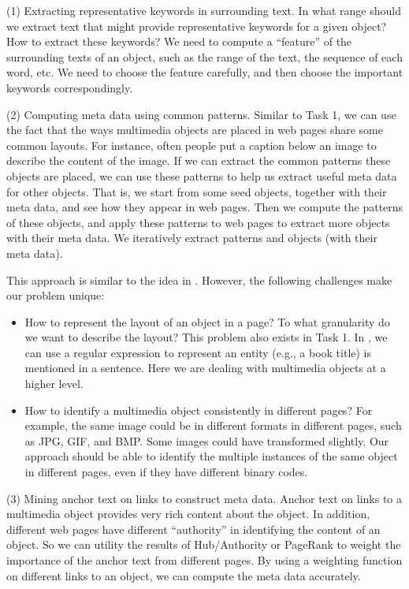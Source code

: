(1) Extracting representative keywords in surrounding text.  In what range
    should we extract text that might provide representative keywords for
    a given object?  How to extract these keywords?  We need to compute a
    ``feature'' of the surrounding texts of an object, such as the range
    of the text, the sequence of each word, etc.  We need to choose the
    feature carefully, and then choose the important keywords
    correspondingly.

(2) Computing meta data using common patterns.  Similar to Task 1, we can
    use the fact that the ways multimedia objects are placed in web pages
    share some common layouts.  For instance, often people put a caption
    below an image to describe the content of the image.  If we can
    extract the common patterns these objects are placed, we can use these
    patterns to help us extract useful meta data for other objects.  That
    is, we start from some seed objects, together with their meta data,
    and see how they appear in web pages.  Then we compute the patterns of
    these objects, and apply these patterns to web pages to extract more
    objects with their meta data.  We iteratively extract patterns and
    objects (with their meta data).

    This approach is similar to the idea in \cite{Brin}.  However, the
    following challenges make our problem unique:

\begin{itemize}
   \item How to represent the layout of an object in a page?  To what
   granularity do we want to describe the layout?  This problem also
   exists in Task 1.  In \cite{Brin}, we can use a regular expression to
   represent an entity (e.g., a book title) is mentioned in a sentence.
   Here we are dealing with multimedia objects at a higher level.

   \item How to identify a multimedia object consistently in different
   pages?  For example, the same image could be in different formats in
   different pages, such as JPG, GIF, and BMP.  Some images could have
   transformed slightly.  Our approach should be able to identify the
   multiple instances of the same object in different pages, even if they
   have different binary codes.
\end{itemize}

(3) Mining anchor text on links to construct meta data.  Anchor text on
    links to a multimedia object provides very rich content about the
    object.  In addition, different web pages have different ``authority''
    in identifying the content of an object.  So we can utility the
    results of Hub/Authority or PageRank to weight the importance of the
    anchor text from different pages.  By using a weighting function on
    different links to an object, we can compute the meta data accurately.

